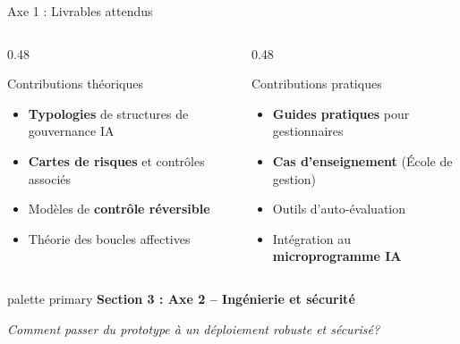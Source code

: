 \documentclass[aspectratio=169,11pt]{beamer}
\begin{document}
\begin{frame}{Axe 1 : Livrables attendus}
  \begin{columns}[T]
    \begin{column}{0.48\textwidth}
      \begin{block}{Contributions théoriques}
        \begin{itemize}\small
          \item \textbf{Typologies} de structures de gouvernance IA
          \item \textbf{Cartes de risques} et contrôles associés
          \item Modèles de \textbf{contrôle réversible}
          \item Théorie des boucles affectives
        \end{itemize}
      \end{block}
    \end{column}
    \begin{column}{0.48\textwidth}
      \begin{block}{Contributions pratiques}
        \begin{itemize}\small
          \item \textbf{Guides pratiques} pour gestionnaires
          \item \textbf{Cas d'enseignement} (École de gestion)
          \item Outils d'auto-évaluation
          \item Intégration au \textbf{microprogramme IA}
        \end{itemize}
      \end{block}
    \end{column}
  \end{columns}
  
  \vspace{0.5em}
  
  \begin{center}
  \end{center}
\end{frame}

\begin{frame}{}
  \begin{beamercolorbox}[wd=\paperwidth,ht=2.5cm,dp=0.5cm,center]{palette primary}
    {\Large\bfseries Section 3 : Axe 2 -- Ingénierie et sécurité}
  \end{beamercolorbox}
  \vspace{2cm}
  \begin{center}
    {\large\textit{Comment passer du prototype à un déploiement robuste et sécurisé?}}
  \end{center}
\end{frame}
\end{document}
